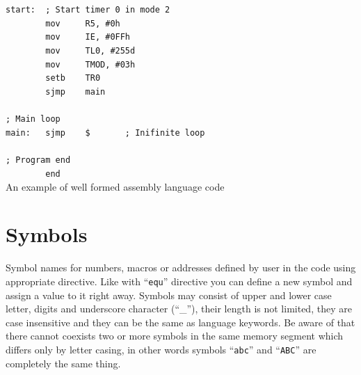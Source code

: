 \documentclass[a4paper,twoside,12pt]{book}
\newcommand{\mysmallfont}{\fontsize{8pt}{10pt} \selectfont{}}
\begin{document}
		\begin{code}[h!]
			\mysmallfont{}
			{\color{highlight_label}\verb'start:'}\verb'  '{\color{highlight_comment}\verb'; Start timer 0 in mode 2'}\\
			\verb'        '{\color{highlight_instruction}\verb'mov'}\verb'     '{\color{highlight_sfr}\verb'R5'}{\color{highlight_oper_sep}\verb','}\verb' '{\color{highlight_imm_hex}\verb'#0h'}\\
			\verb'        '{\color{highlight_instruction}\verb'mov'}\verb'     '{\color{highlight_sfr}\verb'IE'}{\color{highlight_oper_sep}\verb','}\verb' '{\color{highlight_imm_hex}\verb'#0FFh'}\\
			\verb'        '{\color{highlight_instruction}\verb'mov'}\verb'     '{\color{highlight_sfr}\verb'TL0'}{\color{highlight_oper_sep}\verb','}\verb' '{\color{highlight_imm_dec}\verb'#255d'}\\
			\verb'        '{\color{highlight_instruction}\verb'mov'}\verb'     '{\color{highlight_sfr}\verb'TMOD'}{\color{highlight_oper_sep}\verb','}\verb' '{\color{highlight_imm_hex}\verb'#03h'}\\
			\verb'        '{\color{highlight_instruction}\verb'setb'}\verb'    '{\color{highlight_sfr}\verb'TR0'}\\
			\verb'        '{\color{highlight_instruction}\verb'sjmp'}\verb'    '{\color{highlight_constant}\verb'main'}\\
			\verb''\\
			{\color{highlight_comment}\verb'; Main loop'}\\
			{\color{highlight_label}\verb'main:'}\verb'   '{\color{highlight_instruction}\verb'sjmp'}\verb'    '{\color{highlight_constant}\verb'$'}\verb'       '{\color{highlight_comment}\verb'; Inifinite loop'}\\
			\verb''\\
			{\color{highlight_comment}\verb'; Program end'}\\
			\verb'        '{\color{highlight_directive}\verb'end'}\\

			\caption{An example of well formed assembly language code}
		\end{code}

	\section{Symbols}
		Symbol names for numbers, macros or addresses defined by user in the code using appropriate directive. Like with ``\texttt{equ}'' directive you can define a new symbol and assign a value to it right away. Symbols may consist of upper and lower case letter, digits and underscore character (``\_''), their length is not limited, they are case insensitive and they can be the same as language keywords. Be aware of that there cannot coexists two or more symbols in the same memory segment which differs only by letter casing, in other words symbols ``\texttt{abc}'' and ``\texttt{ABC}'' are completely the same thing.
\end{document}
